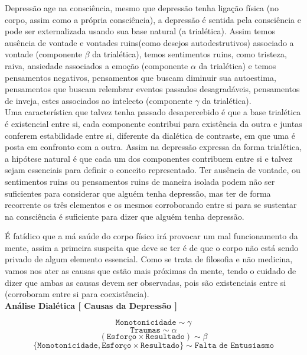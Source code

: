 \documentclass[10pt,a4paper]{report}
\begin{document}
\hrulefill

Depressão age na consciência, mesmo que depressão tenha ligação física (no corpo, assim como a própria consciência), a depressão é sentida pela consciência e pode ser externalizada usando sua base natural (a trialética). Assim temos ausência de vontade e vontades ruins(como desejos autodestrutivos) associado a vontade (componente $\beta$ da trialética), temos sentimentos ruins, como tristeza, raiva, ansiedade associados a emoção (componente $\alpha$ da trialética) e temos pensamentos negativos, pensamentos que buscam diminuir sua autoestima, pensamentos que buscam relembrar eventos passados desagradáveis, pensamentos de inveja, estes associados ao intelecto (componente $\gamma$ da trialética).\\

Uma característica que talvez tenha passado desapercebido é que a base trialética é existencial entre si, cada componente contribui para existência da outra e juntas conferem estabilidade entre si, diferente da dialética de contraste, em que uma é posta em confronto com a outra. Assim na depressão expressa da forma trialética, a hipótese natural é que cada um dos componentes contribuem entre si e talvez sejam essenciais para definir o conceito representado. Ter ausência de vontade, ou sentimentos ruins ou pensamentos ruins de maneira isolada podem não ser suficientes para considerar que alguém tenha depressão, mas ter de forma recorrente os três elementos e os mesmos corroborando entre si para se sustentar na consciência é suficiente para dizer que alguém tenha depressão.

\hspace{\baselineskip}

É fatídico que a má saúde do corpo físico irá provocar um mal funcionamento da mente, assim a primeira suspeita que deve se ter é de que o corpo não está sendo privado de algum elemento essencial. Como se trata de filosofia e não medicina, vamos nos ater as causas que estão mais próximas da mente, tendo o cuidado de dizer que ambas as causas devem ser observadas, pois são existenciais entre si (corroboram entre si para coexistência). \\

\textbf{Análise Dialética [ Causas da Depressão ]}

$$ \texttt{Monotonicidade} \sim \gamma $$
$$ \texttt{Traumas} \sim \alpha $$
$$ ( \texttt{Esforço} \times \texttt{Resultado} ) \sim \beta $$
$$ \{ \texttt{Monotonicidade}, \texttt{Esforço} \times \texttt{Resultado} \} \sim \texttt{Falta de Entusiasmo} $$ 
\end{document}
